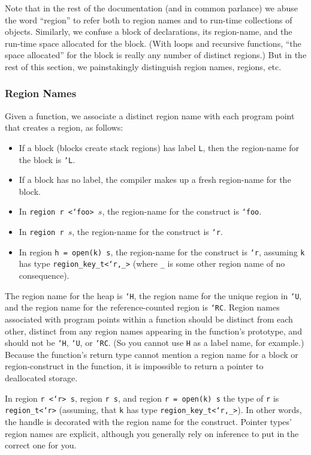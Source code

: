 Note that in the rest of the documentation (and in common parlance) we
abuse the word ``region'' to refer both to region names and to
run-time collections of objects.  Similarly, we confuse a block of
declarations, its region-name, and the run-time space allocated for
the block.  (With loops and recursive functions, ``the space
allocated'' for the block is really any number of distinct regions.)
But in the rest of this section, we painstakingly distinguish
region names, regions, etc.

\subsubsection{Region Names}

Given a function, we associate a distinct region name with each
program point that creates a region, as follows:

\begin{itemize}
\item If a block (blocks create stack regions) has label \texttt{L},
  then the region-name for the block is \texttt{`L}.
\item If a block has no label, the compiler makes up a fresh
  region-name for the block.
\item In \texttt{region r <`foo> $s$}, the region-name for the construct
  is \texttt{`foo}.
\item In \texttt{region r $s$}, the region-name for the construct is
  \texttt{`r}.
\item In region \texttt{h = open(k) s}, the region-name for the construct is
  \texttt{`r}, assuming \texttt{k} has type \texttt{region\_key\_t<`r,_>}
  (where \texttt{_} is some other region name of no consequence).
\end{itemize}

The region name for the heap is \texttt{`H}, the region name for the unique
region in \texttt{`U}, and the region name for the reference-counted region
is \texttt{`RC}.  Region names associated with program points within a
function should be distinct from each other, distinct from any region names
appearing in the function's prototype, and should not be \texttt{`H},
\texttt{`U}, or \texttt{`RC}.  (So you cannot use \texttt{H} as a label
name, for example.)  Because the function's return type cannot mention a
region name for a block or region-construct in the function, it is
impossible to return a pointer to deallocated storage.

In region \texttt{r <`r> s}, region \texttt{r s}, and region \texttt{r =
open(k) s} the type of \texttt{r} is \texttt{region_t<`r>} (assuming, that
\texttt{k} has type \texttt{region\_key\_t<`r,_>}). In other words, the
handle is decorated with the region name for the construct.  Pointer types'
region names are explicit, although you generally rely on inference to put
in the correct one for you.

